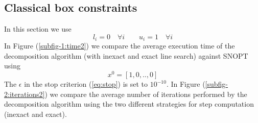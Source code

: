 \subsection{Classical box constraints}
In this section we use 
\begin{equation}\label{eq:classicalbox}
l_i = 0 \quad \forall i \qquad u_i = 1  \quad \forall i
\end{equation} 
In Figure (\ref{subfig-1:time2}) we compare the average execution time of the decomposition algorithm (with inexact and exact line search) against SNOPT using 
\begin{equation}
x^0 = [1, 0, .., 0]
\end{equation}
The $\epsilon$ in the stop criterion (\ref{eq:stop}) is set to $10^{-10}$. In Figure (\ref{subfig-2:iterations2}) we compare the average number of iterations performed by the decomposition algorithm using the two different strategies for step computation (inexact and exact).
